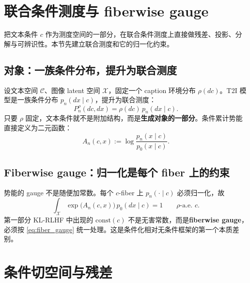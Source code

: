 \documentclass[11pt,a4paper]{article}
\newcommand{\cC}{\mathcal{C}}
\newcommand{\cX}{\mathcal{X}}
\begin{document}
\section{联合条件测度与 fiberwise gauge}
\label{sec:joint_measure}

把文本条件 $c$ 作为测度空间的一部分，在联合条件测度上直接做残差、投影、分解与可辨识性。本节先建立联合测度和它的归一化约束。

\subsection{对象：一族条件分布，提升为联合测度}

设文本空间 $\cC$、图像 latent 空间 $\cX$，固定一个 caption 环境分布 $\rho(dc)$。T2I 模型是一族条件分布 $p_n(dx\mid c)$，提升为联合测度：
\begin{equation}\label{eq:joint}
P_n^\rho(dc,dx) = \rho(dc)\,p_n(dx\mid c).
\end{equation}
只要 $\rho$ 固定，文本条件就不是附加结构，而是\textbf{生成对象的一部分}。条件累计势能直接定义为二元函数：
\begin{equation}\label{eq:cond_potential}
A_n(c,x) := \log\frac{p_n(x\mid c)}{p_0(x\mid c)}.
\end{equation}

\subsection{Fiberwise gauge：归一化是每个 fiber 上的约束}

势能的 gauge 不是随便加常数。每个 $c$-fiber 上 $p_n(\cdot\mid c)$ 必须归一化，故
\begin{equation}\label{eq:fiber_gauge}
\boxed{
\int_{\cX} \exp\bigl(A_n(c,x)\bigr)\,p_0(dx\mid c) = 1 \qquad \rho\text{-a.e. }c.
}
\end{equation}
第一部分 KL-RLHF 中出现的 $\text{const}(c)$ 不是无害常数，而是\textbf{fiberwise gauge}，必须按 \eqref{eq:fiber_gauge} 统一处理。这是条件化相对无条件框架的第一个本质差别。

\section{条件切空间与残差}
\label{sec:tangent}
\end{document}
